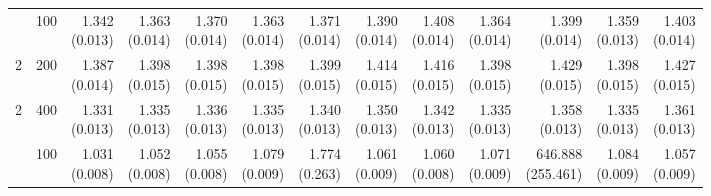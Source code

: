 \begin{table}[p]
{\begin{tabular}{llrrrrrrrrrrr}
\addlinespace
2 & 100 & \shortstack{1.342\\(0.013)} & \shortstack{1.363\\(0.014)} & \shortstack{1.370\\(0.014)} & \shortstack{1.363\\(0.014)} & \shortstack{1.371\\(0.014)} & \shortstack{1.390\\(0.014)} & \shortstack{1.408\\(0.014)} & \shortstack{1.364\\(0.014)} & \shortstack{1.399\\(0.014)} & \shortstack{1.359\\(0.013)} & \shortstack{1.403\\(0.014)} \\
2 & 200 & \shortstack{1.387\\(0.014)} & \shortstack{1.398\\(0.015)} & \shortstack{1.398\\(0.015)} & \shortstack{1.398\\(0.015)} & \shortstack{1.399\\(0.015)} & \shortstack{1.414\\(0.015)} & \shortstack{1.416\\(0.015)} & \shortstack{1.398\\(0.015)} & \shortstack{1.429\\(0.015)} & \shortstack{1.398\\(0.015)} & \shortstack{1.427\\(0.015)} \\
2 & 400 & \shortstack{1.331\\(0.013)} & \shortstack{1.335\\(0.013)} & \shortstack{1.336\\(0.013)} & \shortstack{1.335\\(0.013)} & \shortstack{1.340\\(0.013)} & \shortstack{1.350\\(0.013)} & \shortstack{1.342\\(0.013)} & \shortstack{1.335\\(0.013)} & \shortstack{1.358\\(0.013)} & \shortstack{1.335\\(0.013)} & \shortstack{1.361\\(0.013)} \\
\addlinespace
3 & 100 & \shortstack{1.031\\(0.008)} & \shortstack{1.052\\(0.008)} & \shortstack{1.055\\(0.008)} & \shortstack{1.079\\(0.009)} & \shortstack{1.774\\(0.263)} & \shortstack{1.061\\(0.009)} & \shortstack{1.060\\(0.008)} & \shortstack{1.071\\(0.009)} & \shortstack{646.888\\(255.461)} & \shortstack{1.084\\(0.009)} & \shortstack{1.057\\(0.009)} \\

\end{tabular}}
\end{table}
